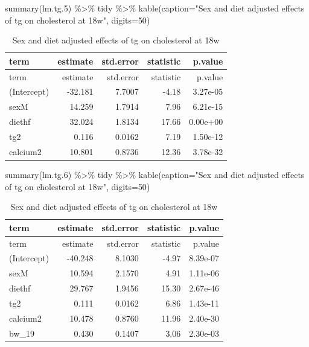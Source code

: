 \documentclass[
]{article}
\newenvironment{Shaded}{\begin{snugshade}}{\end{snugshade}}
\newcommand{\AttributeTok}[1]{\textcolor[rgb]{0.77,0.63,0.00}{#1}}
\newcommand{\DecValTok}[1]{\textcolor[rgb]{0.00,0.00,0.81}{#1}}
\newcommand{\FloatTok}[1]{\textcolor[rgb]{0.00,0.00,0.81}{#1}}
\newcommand{\FunctionTok}[1]{\textcolor[rgb]{0.00,0.00,0.00}{#1}}
\newcommand{\NormalTok}[1]{#1}
\newcommand{\SpecialCharTok}[1]{\textcolor[rgb]{0.00,0.00,0.00}{#1}}
\newcommand{\StringTok}[1]{\textcolor[rgb]{0.31,0.60,0.02}{#1}}
\begin{document}
\begin{Shaded}
\begin{Highlighting}[]
\FunctionTok{summary}\NormalTok{(lm.tg}\FloatTok{.5}\NormalTok{) }\SpecialCharTok{\%\textgreater{}\%}\NormalTok{ tidy }\SpecialCharTok{\%\textgreater{}\%} \FunctionTok{kable}\NormalTok{(}\AttributeTok{caption=}\StringTok{"Sex and diet adjusted effects of tg on cholesterol at 18w"}\NormalTok{, }\AttributeTok{digits=}\DecValTok{50}\NormalTok{)}
\end{Highlighting}
\end{Shaded}

\begin{longtable}[]{@{}lrrrr@{}}
\caption{Sex and diet adjusted effects of tg on cholesterol at
18w}\tabularnewline
\toprule()
term & estimate & std.error & statistic & p.value \\
\midrule()
\endfirsthead
\toprule()
term & estimate & std.error & statistic & p.value \\
\midrule()
\endhead
(Intercept) & -32.181 & 7.7007 & -4.18 & 3.27e-05 \\
sexM & 14.259 & 1.7914 & 7.96 & 6.21e-15 \\
diethf & 32.024 & 1.8134 & 17.66 & 0.00e+00 \\
tg2 & 0.116 & 0.0162 & 7.19 & 1.50e-12 \\
calcium2 & 10.801 & 0.8736 & 12.36 & 3.78e-32 \\
\bottomrule()
\end{longtable}

\begin{Shaded}
\begin{Highlighting}[]
\FunctionTok{summary}\NormalTok{(lm.tg}\FloatTok{.6}\NormalTok{) }\SpecialCharTok{\%\textgreater{}\%}\NormalTok{ tidy }\SpecialCharTok{\%\textgreater{}\%} \FunctionTok{kable}\NormalTok{(}\AttributeTok{caption=}\StringTok{"Sex and diet adjusted effects of tg on cholesterol at 18w"}\NormalTok{, }\AttributeTok{digits=}\DecValTok{50}\NormalTok{)}
\end{Highlighting}
\end{Shaded}

\begin{longtable}[]{@{}lrrrr@{}}
\caption{Sex and diet adjusted effects of tg on cholesterol at
18w}\tabularnewline
\toprule()
term & estimate & std.error & statistic & p.value \\
\midrule()
\endfirsthead
\toprule()
term & estimate & std.error & statistic & p.value \\
\midrule()
\endhead
(Intercept) & -40.248 & 8.1030 & -4.97 & 8.39e-07 \\
sexM & 10.594 & 2.1570 & 4.91 & 1.11e-06 \\
diethf & 29.767 & 1.9456 & 15.30 & 2.67e-46 \\
tg2 & 0.111 & 0.0162 & 6.86 & 1.43e-11 \\
calcium2 & 10.478 & 0.8760 & 11.96 & 2.40e-30 \\
bw\_19 & 0.430 & 0.1407 & 3.06 & 2.30e-03 \\
\bottomrule()
\end{longtable}
\end{document}
